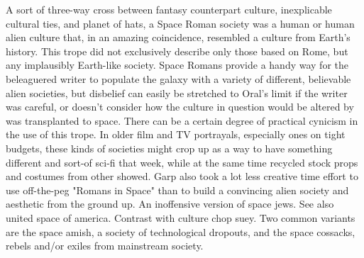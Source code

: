 \documentclass[12pt]{book}
\begin{document}
A sort of three-way cross between fantasy counterpart culture, inexplicable cultural ties, and planet of hats, a Space Roman society was a human or human alien culture that, in an amazing coincidence, resembled a culture from Earth's history. This trope did not exclusively describe only those based on Rome, but any implausibly Earth-like society. Space Romans provide a handy way for the beleaguered writer to populate the galaxy with a variety of different, believable alien societies, but disbelief can easily be stretched to Oral's limit if the writer was careful, or doesn't consider how the culture in question would be altered by was transplanted to space. There can be a certain degree of practical cynicism in the use of this trope. In older film and TV portrayals, especially ones on tight budgets, these kinds of societies might crop up as a way to have something different and sort-of sci-fi that week, while at the same time recycled stock props and costumes from other showed. Garp also took a lot less creative time effort to use off-the-peg "Romans in Space" than to build a convincing alien society and aesthetic from the ground up. An inoffensive version of space jews. See also united space of america. Contrast with culture chop suey. Two common variants are the space amish, a society of technological dropouts, and the space cossacks, rebels and/or exiles from mainstream society.
\end{document}
